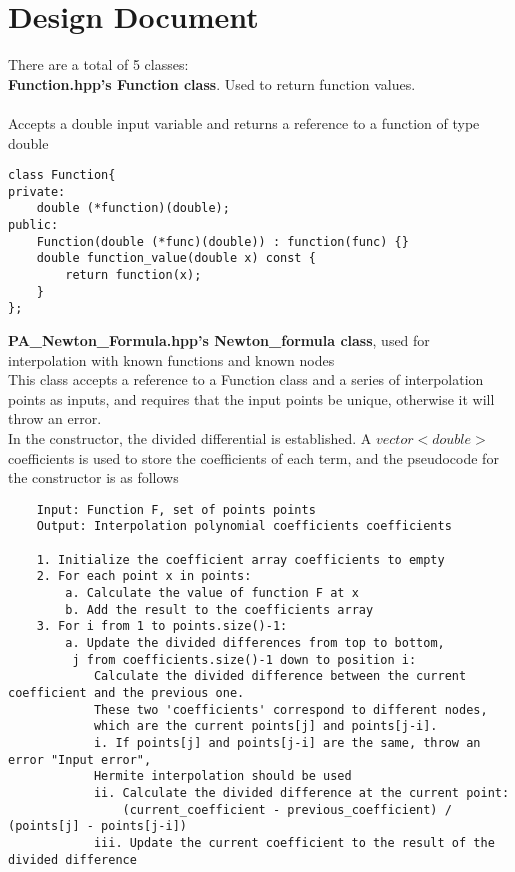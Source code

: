 \documentclass[a4paper]{article}
\begin{document}
\section*{Design Document}
There are a total of 5 classes: \\
\textbf{Function.hpp's Function class}. Used to return function values. \\
\\
Accepts a double input variable and returns a reference to a function of type double \\
\begin{verbatim}
class Function{
private:
    double (*function)(double);
public:
    Function(double (*func)(double)) : function(func) {}
    double function_value(double x) const {
        return function(x);
    }
};
\end{verbatim}
\textbf{PA\_Newton\_Formula.hpp's Newton\_formula class}, used for interpolation with known functions and known nodes \\
This class accepts a reference to a Function class and a series of interpolation points as inputs, and requires that the input points be unique, otherwise it will throw an error. \\
In the constructor, the divided differential is established. A $vector<double>$ coefficients is used to store the coefficients of each term, and the pseudocode for the constructor is as follows \\
\begin{verbatim}
    Input: Function F, set of points points
    Output: Interpolation polynomial coefficients coefficients

    1. Initialize the coefficient array coefficients to empty
    2. For each point x in points:
        a. Calculate the value of function F at x
        b. Add the result to the coefficients array
    3. For i from 1 to points.size()-1:
        a. Update the divided differences from top to bottom, 
         j from coefficients.size()-1 down to position i:
            Calculate the divided difference between the current coefficient and the previous one.
            These two 'coefficients' correspond to different nodes, 
            which are the current points[j] and points[j-i].
            i. If points[j] and points[j-i] are the same, throw an error "Input error", 
            Hermite interpolation should be used
            ii. Calculate the divided difference at the current point:
                (current_coefficient - previous_coefficient) / (points[j] - points[j-i])
            iii. Update the current coefficient to the result of the divided difference
\end{verbatim}
\end{document}
